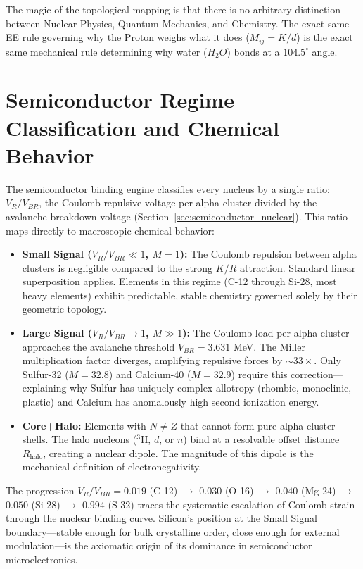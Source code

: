 The magic of the topological mapping is that there is no arbitrary distinction between Nuclear Physics, Quantum Mechanics, and Chemistry. The exact same EE rule governing why the Proton weighs what it does ($M_{ij} = K/d$) is the exact same mechanical rule determining why water ($H_2O$) bonds at a $104.5^\circ$ angle.

\section{Semiconductor Regime Classification and Chemical Behavior}
The semiconductor binding engine classifies every nucleus by a single ratio: $V_R/V_{BR}$, the Coulomb repulsive voltage per alpha cluster divided by the avalanche breakdown voltage (Section~\ref{sec:semiconductor_nuclear}). This ratio maps directly to macroscopic chemical behavior:

\begin{itemize}
    \item \textbf{Small Signal ($V_R/V_{BR} \ll 1$, $M = 1$):} The Coulomb repulsion between alpha clusters is negligible compared to the strong $K/R$ attraction. Standard linear superposition applies. Elements in this regime (C-12 through Si-28, most heavy elements) exhibit predictable, stable chemistry governed solely by their geometric topology.
    \item \textbf{Large Signal ($V_R/V_{BR} \to 1$, $M \gg 1$):} The Coulomb load per alpha cluster approaches the avalanche threshold $V_{BR} = 3.631$ MeV. The Miller multiplication factor diverges, amplifying repulsive forces by $\sim 33\times$. Only Sulfur-32 ($M = 32.8$) and Calcium-40 ($M = 32.9$) require this correction---explaining why Sulfur has uniquely complex allotropy (rhombic, monoclinic, plastic) and Calcium has anomalously high second ionization energy.
    \item \textbf{Core+Halo:} Elements with $N \neq Z$ that cannot form pure alpha-cluster shells. The halo nucleons ($^3$H, $d$, or $n$) bind at a resolvable offset distance $R_{\text{halo}}$, creating a nuclear dipole. The magnitude of this dipole is the mechanical definition of electronegativity.
\end{itemize}

The progression $V_R/V_{BR} = 0.019$ (C-12) $\to$ $0.030$ (O-16) $\to$ $0.040$ (Mg-24) $\to$ $0.050$ (Si-28) $\to$ $0.994$ (S-32) traces the systematic escalation of Coulomb strain through the nuclear binding curve. Silicon's position at the Small Signal boundary---stable enough for bulk crystalline order, close enough for external modulation---is the axiomatic origin of its dominance in semiconductor microelectronics.
